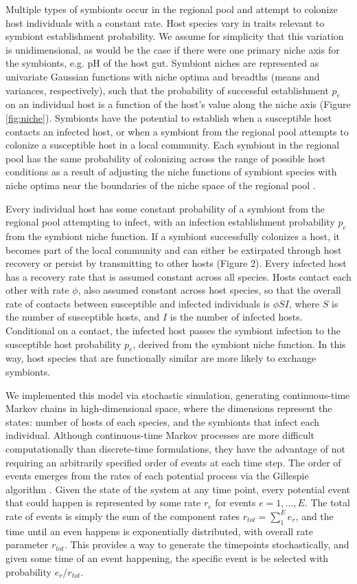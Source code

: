 \documentclass[12pt]{article}
\begin{document}
Multiple types of symbionts occur in the regional pool and attempt to colonize host individuals with a constant rate. 
Host species vary in traits relevant to symbiont establishment probability. 
We assume for simplicity that this variation is unidimensional, as would be the case if there were one primary niche axis for the symbionts, e.g. pH of the host gut. 
Symbiont niches are represented as univariate Gaussian functions with niche optima and breadths (means and variances, respectively), such that the probability of successful establishment $p_e$ on an individual host is a function of the host's value along the niche axis (Figure \ref{fig:niche}). 
Symbionts have the potential to establish when a susceptible host contacts an infected host, or when a symbiont from the regional pool attempts to colonize a susceptible host in a local community.
Each symbiont in the regional pool has the same probability of colonizing across the range of possible host conditions as a result of adjusting the niche functions of symbiont species with niche optima near the boundaries of  the niche space of the regional pool \citep{Allouche2012}.
 
Every individual host has some constant probability of a symbiont from the regional pool attempting to infect, with an infection establishment probability $p_e$ from the symbiont niche function. 
If a symbiont successfully colonizes a host, it becomes part of the local community and can either be extirpated through host recovery or persist by transmitting to other hosts (Figure 2). 
Every infected host has a recovery rate that is assumed constant across all species. 
Hosts contact each other with rate $\phi$, also assumed constant across host species, so that the overall rate of contacts between susceptible and infected individuals is $\phi S I$, where $S$ is the number of susceptible hosts, and $I$ is the number of infected hosts.
Conditional on a contact, the infected host passes the symbiont infection to the susceptible host probability $p_e$, derived from the symbiont niche function.
In this way, host species that are functionally similar are more likely to exchange symbionts.

We implemented this model via stochastic simulation, generating continuous-time Markov chains in high-dimensional space, where the dimensions represent the states: number of hosts of each species, and the symbionts that infect each individual. 
Although continuous-time Markov processes are more difficult computationally than discrete-time formulations, they have the advantage of not requiring an arbitrarily specified order of events at each time step. 
The order of events emerges from the rates of each potential process via the Gillespie algorithm \citep{Gillespie1976}. 
Given the state of the system at any time point, every potential event that could happen is represented by some rate $r_e$ for events $e = 1, ..., E$. 
The total rate of events is simply the sum of the component rates $r_{tot} = \sum_{1}^{E} e_r$, and the time until an even happens is exponentially distributed, with overall rate parameter $r_{tot}$. 
This provides a way to generate the timepoints stochastically, and given some time of an event happening, the specific event is be selected with probability $e_r / r_{tot}$. 
\end{document}
